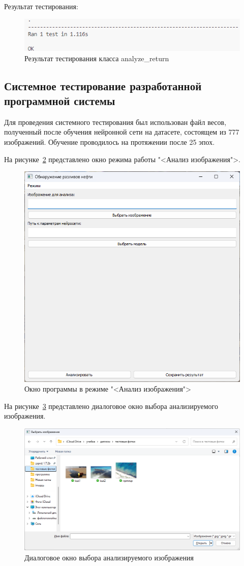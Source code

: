 Результат тестирования:
\begin{figure}[H]
	\centering
	\includegraphics[width=0.7\linewidth]{images/detect_test_results}
	\caption{Результат тестирования класса analyze\_return}
	\label{fig:detecttestresults}
\end{figure}



\subsection{Системное тестирование разработанной программной системы}

Для проведения системного тестирования был использован файл весов, полученный после обучения нейронной сети на датасете, состоящем из 777 изображений. Обучение проводилось на протяжении после 25 эпох.

На рисунке~\ref{fig:ui_analysis_mode} представлено окно режима работы "<Анализ изображения">.
\begin{figure}[H]
	\centering
	\includegraphics[width=0.7\linewidth]{"images/анализ окно"}
	\caption{Окно программы в режиме "<Анализ изображения">}
	\label{fig:ui_analysis_mode}
\end{figure}

На рисунке~\ref{fig:analyze_select_image} представлено диалоговое окно выбора анализируемого изображения.

\begin{figure}[H]
	\centering
	\includegraphics[width=0.7\linewidth]{"images/выбор анализируемого изображения"}
	\caption{Диалоговое окно выбора анализируемого изображения}
	\label{fig:analyze_select_image}
\end{figure}

